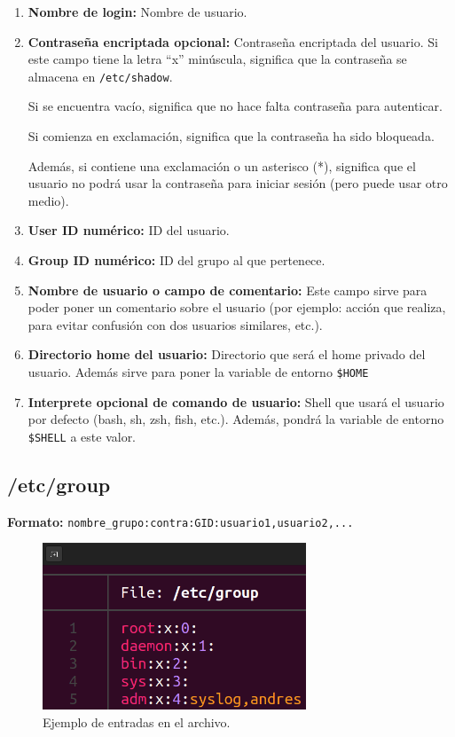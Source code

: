 \documentclass{article}
\begin{document}
\begin{enumerate}
    \item \textbf{Nombre de login: }Nombre de usuario.
    \item \textbf{Contraseña encriptada opcional: }Contraseña encriptada del usuario.
    Si este campo tiene la letra ``x'' minúscula, significa que la contraseña se almacena en \verb|/etc/shadow|.

    Si se encuentra vacío, significa que no hace falta contraseña para autenticar.

    Si comienza en exclamación, significa que la contraseña ha sido bloqueada.

    Además, si contiene una exclamación o un asterisco (*), significa que el usuario no podrá usar la contraseña para iniciar sesión (pero puede usar otro medio).

    \item \textbf{User ID numérico: }ID del usuario.
    \item \textbf{Group ID numérico: }ID del grupo al que pertenece.
    \item \textbf{Nombre de usuario o campo de comentario: }Este campo sirve para poder poner un comentario sobre el usuario (por ejemplo: acción que realiza, para evitar confusión con dos usuarios similares, etc.).
    \item \textbf{Directorio home del usuario: }Directorio que será el home privado del usuario. Además sirve para poner la variable de entorno \verb|$HOME|
    \item \textbf{Interprete opcional de comando de usuario: }Shell que usará el usuario por defecto (bash, sh, zsh, fish, etc.). Además, pondrá la variable de entorno \verb|$SHELL| a este valor.
\end{enumerate}

\newpage

\subsection{/etc/group}
\textbf{Formato: }\verb|nombre_grupo:contra:GID:usuario1,usuario2,...|

\begin{figure}[H]
    \centering
    \includegraphics[width=0.7\textwidth]{imagenes/groupfile.png}
    \caption{Ejemplo de entradas en el archivo.}    
\end{figure}
\end{document}
